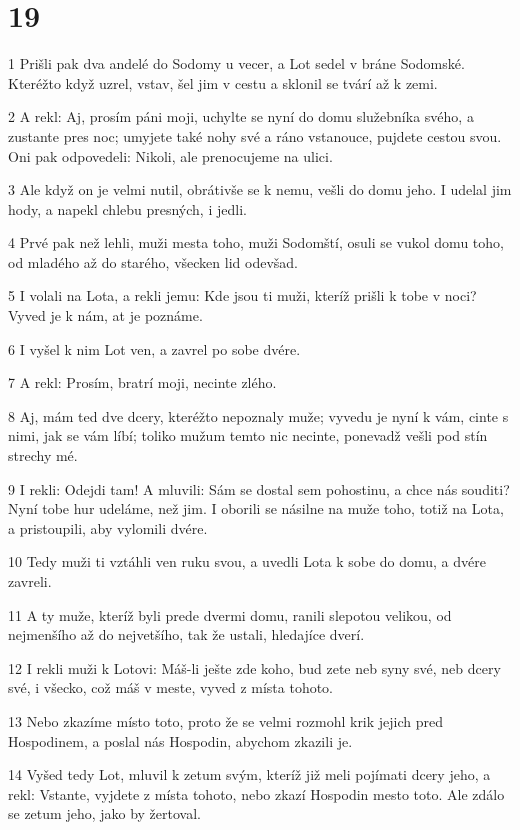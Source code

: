 \chapter{19}

\par 1 Prišli pak dva andelé do Sodomy u vecer, a Lot sedel v bráne Sodomské. Kteréžto když uzrel, vstav, šel jim v cestu a sklonil se tvárí až k zemi.
\par 2 A rekl: Aj, prosím páni moji, uchylte se nyní do domu služebníka svého, a zustante pres noc; umyjete také nohy své a ráno vstanouce, pujdete cestou svou. Oni pak odpovedeli: Nikoli, ale prenocujeme na ulici.
\par 3 Ale když on je velmi nutil, obrátivše se k nemu, vešli do domu jeho. I udelal jim hody, a napekl chlebu presných, i jedli.
\par 4 Prvé pak než lehli, muži mesta toho, muži Sodomští, osuli se vukol domu toho, od mladého až do starého, všecken lid odevšad.
\par 5 I volali na Lota, a rekli jemu: Kde jsou ti muži, kteríž prišli k tobe v noci? Vyved je k nám, at je poznáme.
\par 6 I vyšel k nim Lot ven, a zavrel po sobe dvére.
\par 7 A rekl: Prosím, bratrí moji, necinte zlého.
\par 8 Aj, mám ted dve dcery, kteréžto nepoznaly muže; vyvedu je nyní k vám, cinte s nimi, jak se vám líbí; toliko mužum temto nic necinte, ponevadž vešli pod stín strechy mé.
\par 9 I rekli: Odejdi tam! A mluvili: Sám se dostal sem pohostinu, a chce nás souditi? Nyní tobe hur udeláme, než jim. I oborili se násilne na muže toho, totiž na Lota, a pristoupili, aby vylomili dvére.
\par 10 Tedy muži ti vztáhli ven ruku svou, a uvedli Lota k sobe do domu, a dvére zavreli.
\par 11 A ty muže, kteríž byli prede dvermi domu, ranili slepotou velikou, od nejmenšího až do nejvetšího, tak že ustali, hledajíce dverí.
\par 12 I rekli muži k Lotovi: Máš-li ješte zde koho, bud zete neb syny své, neb dcery své, i všecko, což máš v meste, vyved z místa tohoto.
\par 13 Nebo zkazíme místo toto, proto že se velmi rozmohl krik jejich pred Hospodinem, a poslal nás Hospodin, abychom zkazili je.
\par 14 Vyšed tedy Lot, mluvil k zetum svým, kteríž již meli pojímati dcery jeho, a rekl: Vstante, vyjdete z místa tohoto, nebo zkazí Hospodin mesto toto. Ale zdálo se zetum jeho, jako by žertoval.
